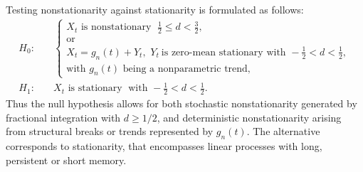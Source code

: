 \documentclass[10pt,a4paper]{amsart}
\numberwithin{equation}{section}
\begin{document}
Testing nonstationarity against stationarity is formulated as follows:
\[
\begin{aligned}
H_0:\quad &
\left\{
\begin{array}{l}
X_t\textrm{ is nonstationary } \; \tfrac12 \le d < \tfrac32, \\
\text{or} \\
X_t=g_n(t)+Y_t,\,\, Y_t\ \textrm{is zero-mean stationary with } -\tfrac12 < d < \tfrac12,\\
\textrm{with }g_n(t)\textrm{ being a nonparametric trend,}
\end{array}
\right.
\\[1em]
H_1:\quad & X_t\textrm{ is stationary }\;\textrm{with } -\tfrac12 < d < \tfrac12.
\end{aligned}
\]
Thus the null hypothesis allows for both stochastic nonstationarity generated by fractional integration with $d \ge 1/2$, and deterministic nonstationarity arising from structural breaks or trends represented by $g_n(t)$. The alternative corresponds to stationarity, that encompasses linear processes with long, persistent or short memory.
\end{document}
